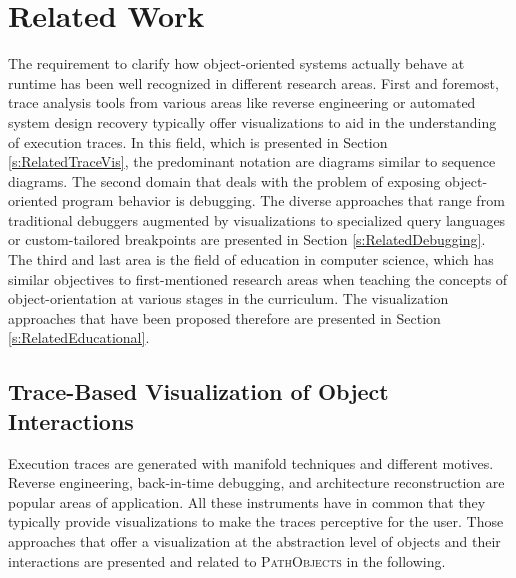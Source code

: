 \chapter{Related Work}
\label{c:relatedwork}
The requirement to clarify how object-oriented systems actually behave at runtime has been well recognized in different research areas. First and foremost, trace analysis tools from various areas like reverse engineering or automated system design recovery typically offer visualizations to aid in the understanding of execution traces.
In this field, which is presented in Section \ref{s:RelatedTraceVis}, the predominant notation are diagrams similar to sequence diagrams.
The second domain that deals with the problem of exposing object-oriented program behavior is debugging.
The diverse approaches that range from traditional debuggers augmented by visualizations to specialized query languages or custom-tailored breakpoints are presented in Section \ref{s:RelatedDebugging}.
The third and last area is the field of education in computer science, which has similar objectives to first-mentioned research areas when teaching the concepts of object-orientation at various stages in the curriculum.
The visualization approaches that have been proposed therefore are presented in Section \ref{s:RelatedEducational}.

\section[Trace-Based Visualization of Object Interactions]{Trace-Based Visualization of Object Interactions%
}
\label{s:RelatedTraceVis}
Execution traces are generated with manifold techniques and different motives.
Reverse engineering, back-in-time debugging, and architecture reconstruction are popular areas of application.
All these instruments have in common that they typically provide visualizations to make the traces perceptive for the user.
Those approaches that offer a visualization at the abstraction level of objects and their interactions are presented and related to \textsc{PathObjects} in the following.

